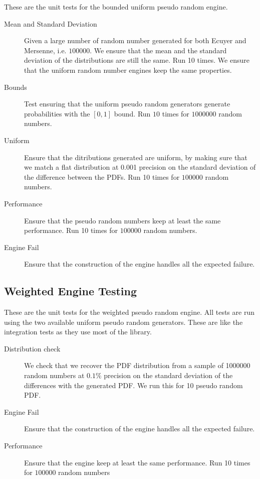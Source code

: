 \documentclass[12pt,a4paper,article]{memoir} %
\begin{document}
These are the unit tests for the bounded uniform pseudo random engine.
	
\begin{description}
	\item [Mean and Standard Deviation]
		Given a large number of random number generated for
		both Ecuyer and Mersenne, i.e. $100000$.
		We ensure that the mean and the standard deviation 
		of the distributions are still the same. Run 10 times.
		We ensure that the uniform random number engines keep
		the same properties.
	\item [Bounds]
		Test ensuring that the uniform pseudo random generators
		generate probabilities with the $[0, 1]$ bound.
		Run $10$ times for $1000000$ random numbers.
	\item [Uniform]
		Ensure that the ditributions generated are uniform,
		by making sure that we match a flat distribution at 0.001
		precision on the standard deviation of the difference
		between the PDFs.
		Run 10 times for $100000$ random numbers.
	\item [Performance]
		Ensure that the pseudo random numbers keep at
		least the same performance.
		Run 10 times for $100000$ random numbers.
	\item [Engine Fail]
		Ensure that the construction of the engine 
		handles all the expected failure.
\end{description}

\subsection{Weighted Engine Testing} 
These are the unit tests for the weighted pseudo random engine.
All tests are run using the two available uniform pseudo random
generators. 
These are like the integration tests as they use most of the library.
\begin{description}
	\item [Distribution check]
		We check that we recover the PDF distribution from
		a sample of 1000000 random numbers at $0.1\%$ precision
		on the standard deviation of the differences with the 
		generated PDF.
		We run this for 10 pseudo random PDF.
	\item [Engine Fail]
		Ensure that the construction of the engine 
		handles all the expected failure.
	\item [Performance]
		Ensure that the engine keep at least the same performance.
		Run 10 times for $100000$ random  numbers	
\end{description}	
\end{document}
